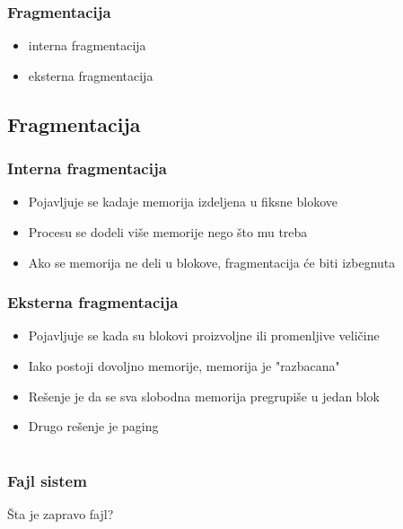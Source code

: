 \documentclass{beamer}
\begin{document}
\begin{frame}
    \frametitle{Fragmentacija}
    \begin{itemize}
        \item interna fragmentacija \newline
        \item eksterna fragmentacija
    \end{itemize}
\end{frame}

\subsection*{Fragmentacija}
\begin{frame}
    \frametitle{Interna fragmentacija}
    \begin{itemize}
        \item Pojavljuje se kadaje memorija izdeljena u fiksne blokove \newline
        \item Procesu se dodeli više memorije nego što mu treba \newline
        \item Ako se memorija ne deli u blokove, fragmentacija će biti izbegnuta
    \end{itemize}
\end{frame}

\begin{frame}
    \frametitle{Eksterna fragmentacija}
    \begin{itemize}
        \item Pojavljuje se kada su blokovi proizvoljne ili promenljive veličine \newline
        \item Iako postoji dovoljno memorije, memorija je "razbacana" \newline
        \item Rešenje je da se sva slobodna memorija pregrupiše u jedan blok \newline
        \item Drugo rešenje je paging
    \end{itemize}
\end{frame}

\section*{}
\subsection*{}
\begin{frame}
    \frametitle{Fajl sistem}
    \begin{center}
        \large{Šta je zapravo fajl?}
    \end{center}
\end{frame}
\end{document}
